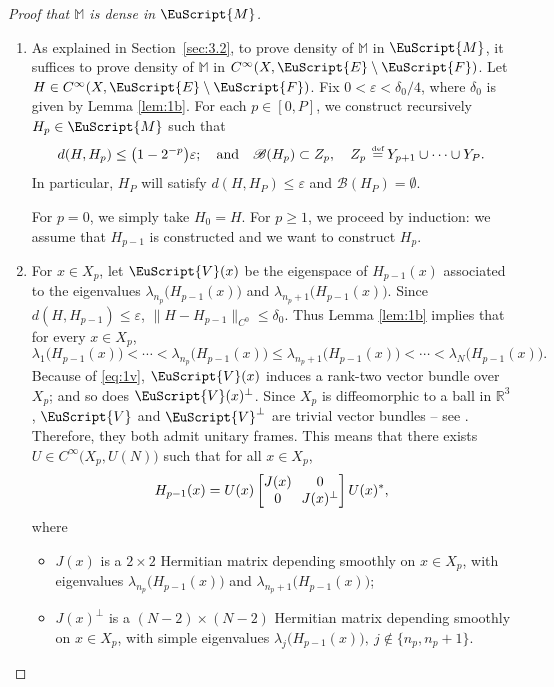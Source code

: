 \documentclass[JEP,XML,SOM,Unicode,NoFloatCountersInSection]{cedram}
\let\mathcal\mathscr
\let\pazocal\EuScript
\theoremstyle{definition}
\newcommand{\FF}{\pazocal{F}}
\newcommand{\VV}{{\pazocal{V}}}
\newcommand{\EE}{\pazocal{E}}
\newcommand{\MM}{\pazocal{M}}
\newcommand{\BB}{\mathcal{B}}
\newcommand{\R}{\mathbb{R}}
\newcommand{\Mm}{\mathbb{M}}
\let\epsi\varepsilon
\newcommand{\matrice}[1]{\arraycolsep3.5pt\begin{bmatrix}#1\end{bmatrix}}
\newcommand{\de}{\,\mathrel{\stackrel{\makebox[0pt]{\mbox{\normalfont\tiny def}}}{=}}}
\begin{document}
\skpt
\begin{proof}[Proof that $\Mm$ is dense in $\MM$]
\begin{enumerate}
\item
As explained in Section~\ref{sec:3.2}, to prove density of $\Mm$ in $\MM$, it suffices to prove density of $\Mm$ in $C^\infty(X,\EE \setminus \FF)$. Let $H \in C^\infty(X,\EE \setminus \FF)$.
Fix $0 < \epsi < \delta_0/4$, where $\delta_0$ is given by Lemma \ref{lem:1b}. For each $p \in [0,P]$, we construct recursively $H_p \in \MM$ such that
\begin{equation*}
d(H, H_p) \leq \bigl(1-2^{-p}\bigr) \epsi ; \quad\text{and}\quad \BB(H_p) \subset Z_p, \quad Z_p \de Y_{p+1} \cup \dots \cup Y_P.
\end{equation*}
In particular, $H_P$ will satisfy $d(H,H_P) \leq \epsi$ and $\BB(H_P) = \emptyset$.

For $p=0$, we simply take $H_0 = H$. For $p \geq 1$, we proceed by induction: we assume that $H_{p-1}$ is constructed and we want to construct $H_p$.

\item
For $x \in X_p$, let $\VV(x)$ be the eigenspace of $H_{p-1}(x)$ associated to the eigenvalues $\lambda_{n_p}\bigl( H_{p-1}(x) \bigr)$ and $\lambda_{n_p+1}\bigl( H_{p-1}(x) \bigr)$. Since $d(H, H_{p-1}) \leq \epsi$, $\| H-H_{p-1}\|_{C^0} \leq \delta_0$. Thus Lemma \ref{lem:1b} implies that for every $x \in X_p$,
\begin{equation}\label{eq:1v}
\lambda_1\bigl( H_{p-1}(x) \bigr) \!<\! \cdots \!<\! \lambda_{n_p}\bigl( H_{p-1}(x) \bigr) \!\leq\! \lambda_{n_p+1}\bigl( H_{p-1}(x) \bigr) \!<\! \cdots \!<\! \lambda_N\bigl( H_{p-1}(x) \bigr).
\end{equation}
Because of \eqref{eq:1v}, $\VV(x)$ induces a rank-two vector bundle over $X_p$; and so does $\VV(x)^\perp$. Since $X_p$ is diffeomorphic to a ball in $\R^3$, $\VV$ and $\VV^\perp$ are trivial vector bundles -- see \eg \cite[\S1.3]{M01}. Therefore, they both admit unitary frames. This means that there exists $U \in C^\infty\bigl(X_p,U(N)\bigr)$ such that for all $x \in X_p$,
\begin{equation}\label{eq:1u}
H_{p-1}(x) = U(x) \matrice{J(x) & 0 \\ 0 & J(x)^\perp} U(x)^*,
\end{equation}
where
\begin{itemize}
\item $J(x)$ is a $2 \times 2$ Hermitian matrix depending smoothly on $x \in X_p$, with eigenvalues $\lambda_{n_p}\bigl( H_{p-1}(x) \bigr)$ and $\lambda_{n_p+1}\bigl( H_{p-1}(x) \bigr)$;
\item $J(x)^\perp$ is a $(N-2) \times (N-2)$ Hermitian matrix depending smoothly on $x \in X_p$, with simple eigenvalues $\lambda_j\bigl( H_{p-1}(x) \bigr), \ j \notin\{ n_p, n_p+1\}$.
\end{itemize}


\end{enumerate}
\end{proof}
\end{document}
